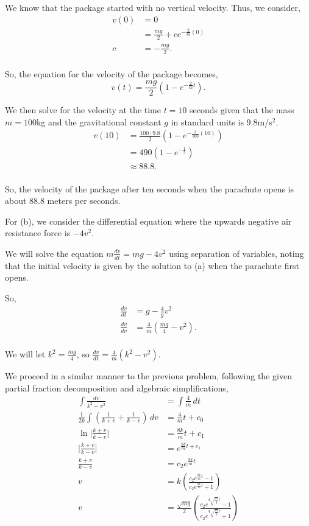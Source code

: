 \documentclass[../hw11]{subfiles}
\begin{document}
We know that the package started with no vertical velocity. Thus, we consider,
\begin{align*}
    v(0)&=0\\
    &=\frac{mg}{2}+ce^{-\frac{2}{m}(0)} \\
    c&=-\frac{mg}{2}. \\
\end{align*}

So, the equation for the velocity of the package becomes,
\[v(t)=\frac{mg}{2}\left( 1-e^{-\frac{2}{m}t} \right).\]

We then solve for the velocity at the time $t=10$ seconds given that the mass $m=100$kg and the gravitational constant $g$ in standard units is 9.8m/s$^2$.
\begin{align*}
    v(10)&=\frac{100\cdot9.8}{2}\left( 1-e^{-\frac{2}{100}(10)} \right)\\
    &= 490\left( 1-e^{-\frac{1}{5}} \right) \\
    &\approx 88.8. \\
\end{align*}

So, the velocity of the package after ten seconds when the parachute opens is about 88.8 meters per seconds.

For (b), we consider the differential equation where the upwards negative air resistance force is $-4v^2$.

We will solve the equation $m\frac{dv}{dt}=mg-4v^2$ using separation of variables, noting that the initial velocity is given by the solution to (a) when the parachute first opens.

So,
\begin{align}
    \frac{dv}{dt}&=g-\frac{4}{g}v^2\\
    \frac{dv}{dv}&=\frac{4}{m}\left( \frac{mg}{4}-v^2 \right).\\
\end{align}

We will let $k^2=\frac{mg}{4}$, so $\frac{dv}{dt}=\frac{4}{m}\left( k^2-v^2 \right)$.

We proceed in a similar manner to the previous problem, following the given partial fraction decomposition and algebraic simplifications,
\begin{align*}
    \int \frac{dv}{k^2-v^2}&=\int \frac{4}{m}\,dt\\
    \frac{1}{2k}\int \left( \frac{1}{k+v} +\frac{1}{k-v}\right)\,dv&=\frac{4}{m}t+c_0\\
    \ln{\bigg|\frac{k+v}{k-v}\bigg|}&=\frac{8k}{m}t+c_1\\
    \Bigg|\frac{k+v}{k-v}\Bigg|&=e^{\frac{8k}{m}t+c_1}\\
    \frac{k+v}{k-v}&=c_2e^{\frac{8k}{m}t}\\
    v&=k\left( \frac{c_2e^{\frac{8k}{m}t}-1}{c_2e^{\frac{8k}{m}t}+1} \right)\\
    v&=\frac{\sqrt{mg}}{2}\left( \frac{c_2e^{4\sqrt{\frac{m}{g}}t}-1}{c_2e^{4\sqrt{\frac{m}{g}}t}+1} \right)\\
\end{align*}
\end{document}
